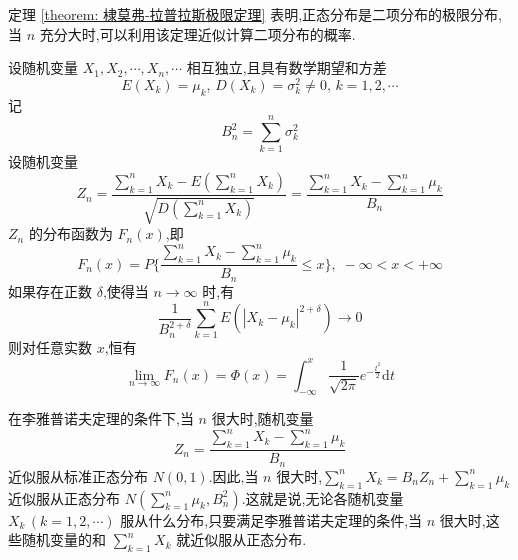 定理 \ref{theorem: 棣莫弗-拉普拉斯极限定理} 表明,正态分布是二项分布的极限分布,当 $n$ 充分大时,可以利用该定理近似计算二项分布的概率.

\begin{theorem}[][李雅普诺夫定理]
    设随机变量 $X_1,X_2,\cdots,X_n,\cdots$ 相互独立,且具有数学期望和方差
    $$
    E(X_k) = \mu_k, \, D(X_k) = \sigma_k^2 \not= 0, \, k=1,2,\cdots
    $$
    记
    $$
    B_n^2 = \sum_{k=1}^n \sigma_k^2
    $$
    设随机变量
    $$
    Z_n = \dfrac{\displaystyle\sum_{k=1}^n X_k - E(\displaystyle\sum_{k=1}^n X_k)}{\sqrt{D(\displaystyle\sum_{k=1}^n X_k)}} = \dfrac{\displaystyle\sum_{k=1}^n X_k - \displaystyle\sum_{k=1}^n \mu_k}{B_n}
    $$
    $Z_n$ 的分布函数为 $F_n(x)$,即
    $$
    F_n(x) = P \Bigg\{ \dfrac{\displaystyle\sum_{k=1}^n X_k - \displaystyle\sum_{k=1}^n \mu_k}{B_n} \leqslant x \Bigg\}, \; -\infty < x < +\infty
    $$
    如果存在正数 $\delta$,使得当 $n \to \infty$ 时,有
    $$
    \dfrac{1}{B_n^{2+\delta}} \sum_{k=1}^n E(|X_k - \mu_k|^{2+\delta}) \to 0
    $$
    则对任意实数 $x$,恒有
    $$
    \lim_{n \to \infty} F_n(x) = \varPhi(x) = \int_{-\infty}^x \dfrac{1}{\sqrt{2\pi}} e^{-\frac{t^2}{2}} \text{d}t
    $$
\end{theorem}

在李雅普诺夫定理的条件下,当 $n$ 很大时,随机变量
$$
Z_n = \dfrac{\displaystyle\sum_{k=1}^n X_k - \displaystyle\sum_{k=1}^n \mu_k}{B_n}
$$
近似服从标准正态分布 $N(0,1)$.因此,当 $n$ 很大时,$\displaystyle\sum_{k=1}^n X_k = B_n Z_n + \displaystyle\sum_{k=1}^n \mu_k$ 近似服从正态分布 $N(\displaystyle\sum_{k=1}^n \mu_k, B_n^2)$.这就是说,无论各随机变量 $X_k \, (k=1,2,\cdots)$ 服从什么分布,只要满足李雅普诺夫定理的条件,当 $n$ 很大时,这些随机变量的和 $\displaystyle\sum_{k=1}^n X_k$ 就近似服从正态分布.